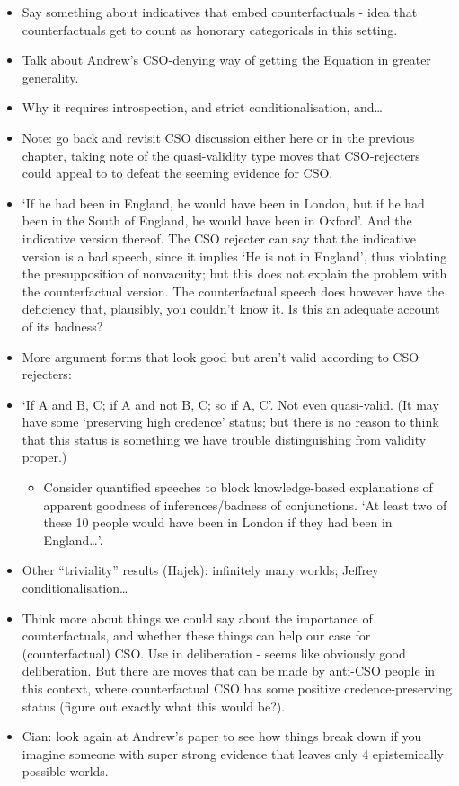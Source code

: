 \documentclass[If.tex]{subfiles}
\begin{document}
\begin{itemize}
\item
  Say something about indicatives that embed counterfactuals - idea that
  counterfactuals get to count as honorary categoricals in this setting.
\item
  Talk about Andrew's CSO-denying way of getting the Equation in greater
  generality.
\item
  Why it requires introspection, and strict conditionalisation,
  and\ldots{}
\item
  Note: go back and revisit CSO discussion either here or in the
  previous chapter, taking note of the quasi-validity type moves that
  CSO-rejecters could appeal to to defeat the seeming evidence for
  CSO.\\
\item
  ‘If he had been in England, he would have been in London, but if he
  had been in the South of England, he would have been in Oxford’. And
  the indicative version thereof. The CSO rejecter can say that the
  indicative version is a bad speech, since it implies ‘He is not in
  England’, thus violating the presupposition of nonvacuity; but this
  does not explain the problem with the counterfactual version. The
  counterfactual speech does however have the deficiency that,
  plausibly, you couldn't know it. Is this an adequate account of its
  badness?\\
\item
  More argument forms that look good but aren't valid according to CSO
  rejecters:
\item
  ‘If A and B, C; if A and not B, C; so if A, C’. Not even quasi-valid.
  (It may have some ‘preserving high credence’ status; but there is no
  reason to think that this status is something we have trouble
  distinguishing from validity proper.)

  \begin{itemize}
    \item
    Consider quantified speeches to block knowledge-based explanations
    of apparent goodness of inferences/badness of conjunctions. ‘At
    least two of these 10 people would have been in London if they had
    been in England\ldots{}’.
  \end{itemize}
\item
  Other “triviality” results (Hajek): infinitely many worlds; Jeffrey
  conditionalisation\ldots{}
\item
  Think more about things we could say about the importance of
  counterfactuals, and whether these things can help our case for
  (counterfactual) CSO. Use in deliberation - seems like obviously good
  deliberation. But there are moves that can be made by anti-CSO people
  in this context, where counterfactual CSO has some positive
  credence-preserving status (figure out exactly what this would be?).
\item
  Cian: look again at Andrew's paper to see how things break down if you
  imagine someone with super strong evidence that leaves only 4
  epistemically possible worlds.
\end{itemize}
\end{document}

